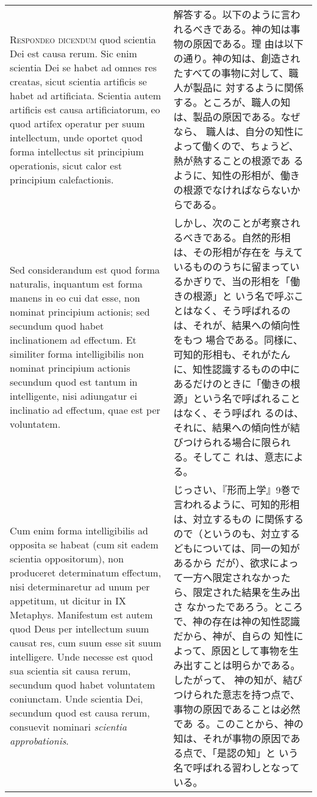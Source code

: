 \documentclass[10pt]{jsarticle} %
\begin{document}
\begin{longtable}{p{21em}p{21em}}
{\scshape Respondeo dicendum} quod scientia Dei est causa rerum. Sic
enim scientia Dei se habet ad omnes res creatas, sicut scientia
artificis se habet ad artificiata. Scientia autem artificis est causa
artificiatorum, eo quod artifex operatur per suum intellectum, unde
oportet quod forma intellectus sit principium operationis, sicut calor
est principium calefactionis.


&

解答する。以下のように言われるべきである。神の知は事物の原因である。理
由は以下の通り。神の知は、創造されたすべての事物に対して、職人が製品に
対するように関係する。ところが、職人の知は、製品の原因である。なぜなら、
職人は、自分の知性によって働くので、ちょうど、熱が熱することの根源であ
るように、知性の形相が、働きの根源でなければならないからである。

\\



Sed considerandum est quod forma naturalis, inquantum est forma manens
in eo cui dat esse, non nominat principium actionis; sed secundum quod
habet inclinationem ad effectum. Et similiter forma intelligibilis non
nominat principium actionis secundum quod est tantum in intelligente,
nisi adiungatur ei inclinatio ad effectum, quae est per voluntatem.

&

しかし、次のことが考察されるべきである。自然的形相は、その形相が存在を
与えているもののうちに留まっているかぎりで、当の形相を「働きの根源」と
いう名で呼ぶことはなく、そう呼ばれるのは、それが、結果への傾向性をもつ
場合である。同様に、可知的形相も、それがたんに、知性認識するものの中に
あるだけのときに「働きの根源」という名で呼ばれることはなく、そう呼ばれ
るのは、それに、結果への傾向性が結びつけられる場合に限られる。そしてこ
れは、意志による。

\\

Cum enim forma intelligibilis ad opposita se habeat (cum sit eadem
scientia oppositorum), non produceret determinatum effectum, nisi
determinaretur ad unum per appetitum, ut dicitur in IX
Metaphys. Manifestum est autem quod Deus per intellectum suum causat
res, cum suum esse sit suum intelligere. Unde necesse est quod sua
scientia sit causa rerum, secundum quod habet voluntatem
coniunctam. Unde scientia Dei, secundum quod est causa rerum,
consuevit nominari {\itshape scientia approbationis}.

&

じっさい、『形而上学』9巻で言われるように、可知的形相は、対立するもの
に関係するので（というのも、対立するどもについては、同一の知があるから
だが）、欲求によって一方へ限定されなかったら、限定された結果を生み出さ
なかったであろう。ところで、神の存在は神の知性認識だから、神が、自らの
知性によって、原因として事物を生み出すことは明らかである。したがって、
神の知が、結びつけられた意志を持つ点で、事物の原因であることは必然であ
る。このことから、神の知は、それが事物の原因である点で、「是認の知」と
いう名で呼ばれる習わしとなっている。



\end{longtable}
\end{document}

